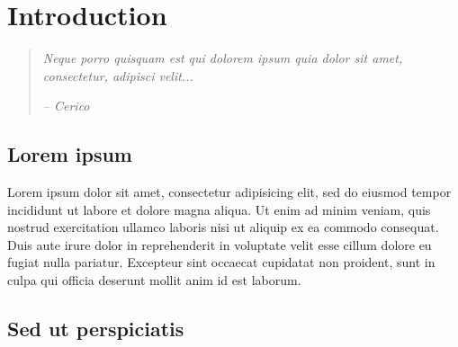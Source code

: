 
%
%
%


\chapter{Introduction}
\label{ch:11Introduction}

\begin{quotation}
  {\small\it Neque porro quisquam est qui dolorem ipsum quia dolor sit amet, consectetur, adipisci velit...}

{\small\it -- Cerico}
\end{quotation}




\section{Lorem ipsum}

Lorem ipsum dolor sit amet, consectetur adipisicing elit, sed do eiusmod tempor incididunt ut labore et dolore magna aliqua. Ut enim ad minim veniam, quis nostrud exercitation ullamco laboris nisi ut aliquip ex ea commodo consequat. Duis aute irure dolor in reprehenderit in voluptate velit esse cillum dolore eu fugiat nulla pariatur. Excepteur sint occaecat cupidatat non proident, sunt in culpa qui officia deserunt mollit anim id est laborum.


\section{Sed ut perspiciatis}

